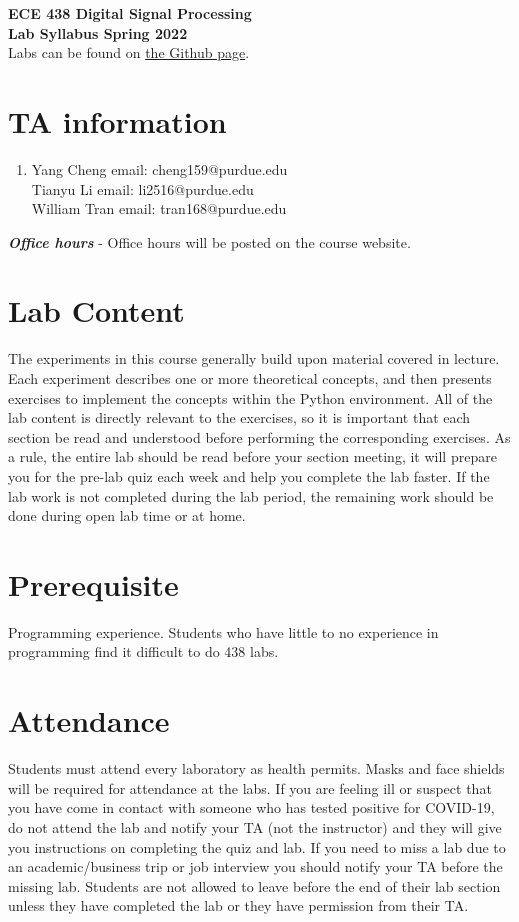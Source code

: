 \documentclass[letterpaper, 11pt]{article}
\newcommand\mytab{\tab \hspace{-2cm}}
\begin{document}
\begin{center}
\huge \textbf{ ECE 438 Digital Signal Processing} \\
 \textbf{Lab Syllabus Spring 2022 }\\
\medskip
\normalsize Labs can be found on \href{https://github.com/Purdue-ECE438-Labs/}{the Github page}.
\end{center}

\section*{TA information}
\begin{enumerate}
\item[] Yang Cheng \mytab email: cheng159@purdue.edu\\
Tianyu Li \mytab email: li2516@purdue.edu\\
William Tran \mytab email: tran168@purdue.edu
\end{enumerate}



\textit{\textbf{Office hours}} - Office hours will be posted on the course website.

\section*{Lab Content}
The experiments in this course generally build upon material covered in lecture. Each experiment describes one or more theoretical concepts, and then presents exercises to implement the concepts within the Python environment. All of the lab content is directly relevant to the exercises, so it is important that each section be read and understood before performing the corresponding exercises. As a rule, the entire lab should be read before your section meeting, it will prepare you for the pre-lab quiz each week and help you complete the lab faster. If the lab work is not completed during the lab period, the remaining work should be done during open lab time or at home.

\section*{Prerequisite}
Programming experience. Students who have little to no experience in programming find it difficult to do 438 labs.

\section*{Attendance}
Students must attend every laboratory as health permits. Masks and face shields will be required for attendance at the labs. If you are feeling ill or suspect that you have come in contact with someone who has tested positive for COVID-19, do not attend the lab and notify your TA (not the instructor) and they will give you instructions on completing the quiz and lab. If you need to miss a lab due to an academic/business trip or job interview you should notify your TA before the missing lab. Students are not allowed to leave before the end of their lab section unless they have completed the lab or they have permission from their TA.
\end{document}
